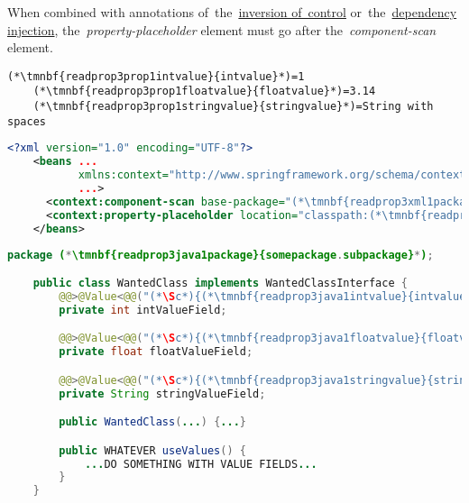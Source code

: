 \warning When combined with annotations of~the~\hyperref[iocannotations]{inversion of~control} or~the~\hyperref[autowiring]{dependency injection}, the~\textit{property-placeholder} element must go after the~\textit{component-scan} element.

\enlargethispage{20mm}
\thispagestyle{empty}
\example
\begin{lstlisting}[title={A \textit{properties} file called \tmnbf{readprop3prop1filename}{\textit{annotations.properties}}}]
    (*\tmnbf{readprop3prop1intvalue}{intvalue}*)=1
    (*\tmnbf{readprop3prop1floatvalue}{floatvalue}*)=3.14
    (*\tmnbf{readprop3prop1stringvalue}{stringvalue}*)=String with spaces
\end{lstlisting}
\begin{lstlisting}[language=XML, title={Configuration XML}]
    <?xml version="1.0" encoding="UTF-8"?>
    <beans ...
           xmlns:context="http://www.springframework.org/schema/context"
           ...>
      <context:component-scan base-package="(*\tmnbf{readprop3xml1package}{somepackage.subpackage}[ForestGreen]*)"/>
      <context:property-placeholder location="classpath:(*\tmnbf{readprop3xml1filename}{annotations.properties}[ForestGreen]*)" file-encoding="utf-8"/>
    </beans>
\end{lstlisting}
\begin{lstlisting}[language=Java, title={Wanted class with any constructor}]
    package (*\tmnbf{readprop3java1package}{somepackage.subpackage}*);

    public class WantedClass implements WantedClassInterface {
        @@>@Value<@@("(*\Sc*){(*\tmnbf{readprop3java1intvalue}{intvalue}[ForestGreen]*)}")
        private int intValueField;

        @@>@Value<@@("(*\Sc*){(*\tmnbf{readprop3java1floatvalue}{floatvalue}[ForestGreen]*)}")
        private float floatValueField;

        @@>@Value<@@("(*\Sc*){(*\tmnbf{readprop3java1stringvalue}{stringvalue}[ForestGreen]*)}")
        private String stringValueField;

        public WantedClass(...) {...}

        public WHATEVER useValues() {
            ...DO SOMETHING WITH VALUE FIELDS...
        }
    }
\end{lstlisting}
\newpage


